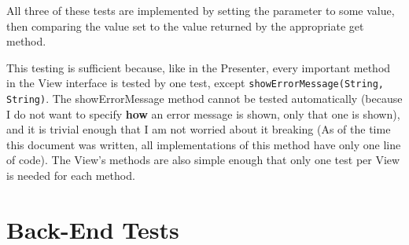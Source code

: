 \documentclass[11pt]{article}
\begin{document}
All three of these tests are implemented by setting the parameter to some value, then comparing the value set to the value returned by the appropriate get method.

This testing is sufficient because, like in the Presenter, every important method in the View interface is tested by one test, except \texttt{showErrorMessage(String, String)}.  The showErrorMessage method cannot be tested automatically (because I do not want to specify \textbf{how} an error message is shown, only that one is shown), and it is trivial enough that I am not worried about it breaking (As of the time this document was written, all implementations of this method have only one line of code).  The View's methods are also simple enough that only one test per View is needed for each method.
\newpage

\section{Back-End Tests}
\label{sec:orge615a32}
\end{document}
